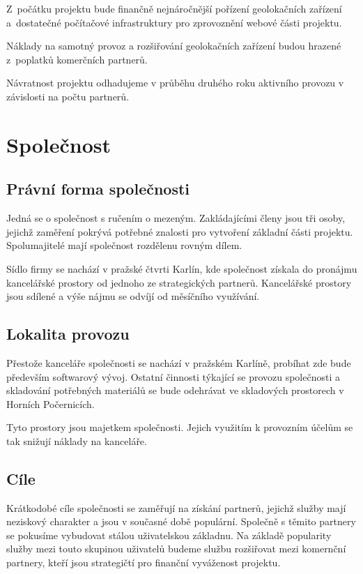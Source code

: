 \documentclass[12pt,czech]{article}
\begin{document}
Z~počátku projektu bude finančně nejnáročnější pořízení geolokačních zařízení a~dostatečné počítačové infrastruktury pro zprovoznění webové části projektu.

Náklady na samotný provoz a rozšiřování geolokačních zařízení budou hrazené z~poplatků komerčních partnerů.

Návratnost projektu odhadujeme v průběhu druhého roku aktivního provozu v závislosti na počtu partnerů.

\newpage
\section{Společnost}

\subsection{Právní forma společnosti}

Jedná se o společnost s ručením o mezeným.
Zakládajícími členy jsou tři osoby, jejichž zaměření pokrývá potřebné znalosti pro vytvoření základní části projektu.
Spolumajitelé mají společnost rozdělenu rovným dílem.

Sídlo firmy se nachází v pražské čtvrti Karlín, kde společnost získala do pronájmu kancelářské prostory od jednoho ze strategických partnerů.
Kancelářské prostory jsou sdílené a výše nájmu se odvíjí od měsíčního využívání.

\subsection{Lokalita provozu}

Přestože kanceláře společnosti se nachází v pražském Karlíně, probíhat zde bude především softwarový vývoj.
Ostatní činnosti týkající se provozu společnosti a skladování potřebných materiálů se bude odehrávat ve skladových prostorech v Horních Počernicích.

Tyto prostory jsou majetkem společnosti.
Jejich využitím k provozním účelům se tak snižují náklady na kanceláře.

\subsection{Cíle}

Krátkodobé cíle společnosti se zaměřují na získání partnerů, jejichž služby mají neziskový charakter a jsou v současné době populární.
Společně s těmito partnery se pokusíme vybudovat stálou uživatelskou základnu.
Na základě popularity služby mezi touto skupinou uživatelů budeme službu rozšiřovat mezi komernční partnery, kteří jsou strategičtí pro finanční vyváženost projektu.
\end{document}
